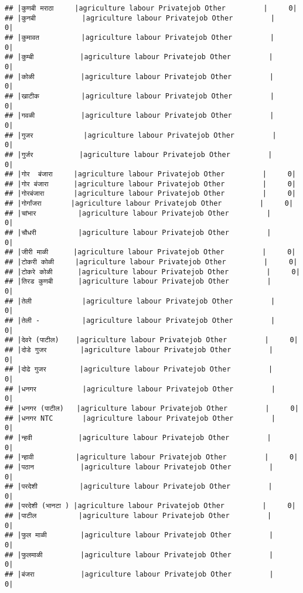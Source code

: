 \documentclass[
]{article}
\begin{document}
\begin{verbatim}
## |कुणबी मराठा     |agriculture labour Privatejob Other         |     0|
## |कुनबी           |agriculture labour Privatejob Other         |     0|
## |कुमावत          |agriculture labour Privatejob Other         |     0|
## |कुम्बी           |agriculture labour Privatejob Other         |     0|
## |कोळी           |agriculture labour Privatejob Other         |     0|
## |खाटीक          |agriculture labour Privatejob Other         |     0|
## |गवळी           |agriculture labour Privatejob Other         |     0|
## |गुजर            |agriculture labour Privatejob Other         |     0|
## |गुर्जर           |agriculture labour Privatejob Other         |     0|
## |गोर  बंजारा     |agriculture labour Privatejob Other         |     0|
## |गोर बंजारा      |agriculture labour Privatejob Other         |     0|
## |गोरबंजारा       |agriculture labour Privatejob Other         |     0|
## |गोर्गांजरा       |agriculture labour Privatejob Other         |     0|
## |चांभार          |agriculture labour Privatejob Other         |     0|
## |चौधरी          |agriculture labour Privatejob Other         |     0|
## |जीरी माळी      |agriculture labour Privatejob Other         |     0|
## |टोकरी कोळी     |agriculture labour Privatejob Other         |     0|
## |टोकरे कोळी      |agriculture labour Privatejob Other         |     0|
## |तिरड कुणबी      |agriculture labour Privatejob Other         |     0|
## |तेली            |agriculture labour Privatejob Other         |     0|
## |तेली -          |agriculture labour Privatejob Other         |     0|
## |देवरे (पाटील)    |agriculture labour Privatejob Other         |     0|
## |दोडे गुजर        |agriculture labour Privatejob Other         |     0|
## |दोढे गुजर        |agriculture labour Privatejob Other         |     0|
## |धनगर           |agriculture labour Privatejob Other         |     0|
## |धनगर (पाटील)   |agriculture labour Privatejob Other         |     0|
## |धनगर NTC       |agriculture labour Privatejob Other         |     0|
## |न्हवी           |agriculture labour Privatejob Other         |     0|
## |न्हावी          |agriculture labour Privatejob Other         |     0|
## |पठान           |agriculture labour Privatejob Other         |     0|
## |परदेशी          |agriculture labour Privatejob Other         |     0|
## |परदेशी (भानटा ) |agriculture labour Privatejob Other         |     0|
## |पाटील          |agriculture labour Privatejob Other         |     0|
## |फुल माळी        |agriculture labour Privatejob Other         |     0|
## |फुलमाळी         |agriculture labour Privatejob Other         |     0|
## |बंजरा           |agriculture labour Privatejob Other         |     0|

\end{verbatim}
\end{document}
